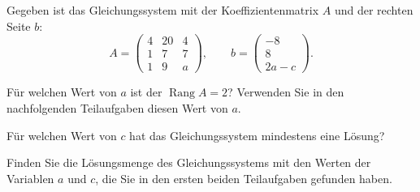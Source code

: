 Gegeben ist das Gleichungssystem mit der Koeffizientenmatrix $A$ und der
rechten Seite $b$:
\[
A
=
\begin{pmatrix}
4&20&4\\
1&7&7\\
1&9&a
\end{pmatrix},
\qquad
b=\begin{pmatrix}
-8\\8\\2a-c
\end{pmatrix}.
\]
\begin{teilaufgaben}
\item
Für welchen Wert von $a$ ist der $\operatorname{Rang}A=2$?
Verwenden Sie in den nachfolgenden Teilaufgaben diesen Wert von $a$.
\item 
Für welchen Wert von $c$ hat das Gleichungssystem mindestens eine Lösung?
\item
Finden Sie die Lösungsmenge des Gleichungssystems mit den Werten der
Variablen $a$ und $c$, die Sie in den ersten beiden Teilaufgaben gefunden
haben.
\end{teilaufgaben}


